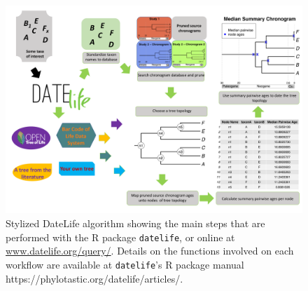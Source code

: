



\begin{figure}[!h]
\includegraphics{../figures/figure1/figure1-vertical-final.pdf}
\caption{
Stylized DateLife algorithm showing the main steps that are performed
with the R package \texttt{datelife}, or online at \url{www.datelife.org/query/}.
Details on the functions involved on each workflow are available at \texttt{datelife}'s
R package manual https://phylotastic.org/datelife/articles/.
}
\label{fig:workflow}
\end{figure}

